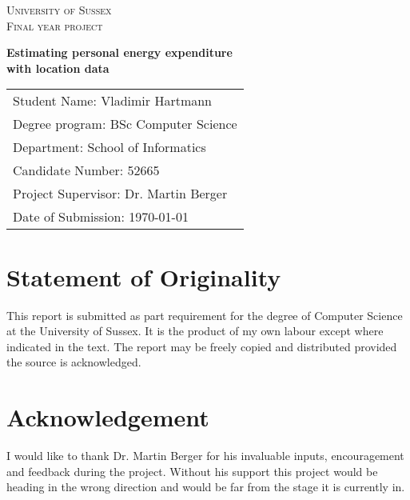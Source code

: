 \documentclass[12pt, a4paper]{report}   %
\begin{document}
\makeatletter
\def\url@leostyle{%
  \@ifundefined{selectfont}{\def\UrlFont{\sf}}{\def\UrlFont{\small\ttfamily}}}
\makeatother



\begin{center}

\textsc{\large University of Sussex}\\[1.5cm]
\textsc{Final year project}\\[2cm]

\begin{spacing}{2.5}
{\Large \bfseries Estimating personal energy expenditure \\ with location data}\\[5 cm]
\end{spacing}
\end{center}
\vfill


\begin{spacing}{1.5}
\begin{tabular}{l}
Student Name: Vladimir Hartmann \\
Degree program: BSc Computer Science \\
Department: School of Informatics \\
Candidate Number: 52665 \\
Project Supervisor: Dr. Martin Berger \\
Date of Submission: {\today}
\end{tabular}
\end{spacing}
\thispagestyle{empty}


\clearpage
{}
\section*{Statement of Originality}
This report is submitted as part requirement for the degree of Computer Science at the University of Sussex. It is the product of my own labour except where indicated in the text. The report may be freely copied and distributed provided the source is acknowledged.


\clearpage
{}
\section*{Acknowledgement}
I would like to thank Dr. Martin Berger for his invaluable inputs, encouragement and feedback during the project. Without his support this project would be heading in the wrong direction and would be far from the stage it is currently in.
\end{document}
